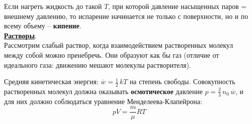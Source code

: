 \documentclass[12pt,epsfig,color,russian]{article}
\begin{document}
Если нагреть жидкость до такой $T$, при которой давление насыщенных паров = внешнему давлению, то испарение начинается не только с по\-верх\-но\-сти, но и по всему объему -- {\bf кипение}.\\

\underline{\bf Растворы}.\\
Рассмотрим слабый раствор, когда взаимодействием растворенных молекул между собой можно пренебречь. Они образуют как бы газ (отличие от идеального газа: движению мешают молекулы растворителя).

 Средняя кинетическая энергия: $\overline{w}=\frac12\,kT$ на степень свободы.
 Сово\-куп\-ность растворенных молекул должна оказывать {\bf осмотическое} да\-в\-ле\-ние $p=\frac23\,n_0\,\overline{w}$, и для них должно соблюдаться уравнение Менделеева-Кла\-пейрона:
 \begin{displaymath}
  pV=\frac m\mu RT
 \end{displaymath}
\end{document}
